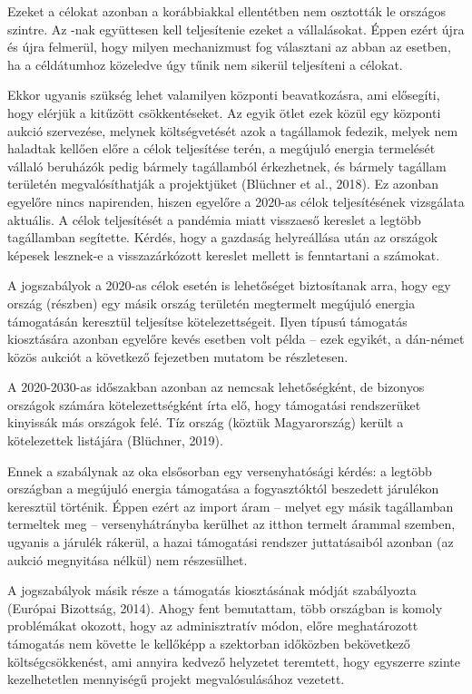 \documentclass[twoside, magyar, showtrims]{corvinusphd}
\theoremstyle{plain}
\theoremstyle{remark}
\theoremstyle{definition}
\begin{document}
Ezeket a célokat azonban a korábbiakkal
ellentétben nem osztották le országos szintre.
Az -nak együttesen kell teljesítenie ezeket a vállalásokat.
Éppen ezért újra és újra felmerül,
hogy milyen mechanizmust fog választani
az  abban az esetben, ha a céldátumhoz közeledve
úgy tűnik nem sikerül teljesíteni a célokat.

Ekkor ugyanis szükség lehet valamilyen
központi beavatkozásra, ami elősegíti, hogy
elérjük a kitűzött csökkentéseket. Az egyik
ötlet ezek közül egy központi aukció szervezése,
melynek költségvetését azok a tagállamok fedezik,
melyek nem haladtak  kellően előre a célok teljesítése terén,
a megújuló energia termelését vállaló
beruházók pedig bármely tagállamból érkezhetnek,
és bármely tagállam területén megvalósíthatják
a projektjüket (Blüchner et al., 2018).
Ez azonban egyelőre nincs napirenden, hiszen egyelőre
a 2020-as célok teljesítésének vizsgálata aktuális.
A célok teljesítését a pandémia miatt visszaeső
kereslet a legtöbb tagállamban segítette.
Kérdés, hogy a gazdaság helyreállása után
az országok képesek lesznek-e a visszazárkózott
kereslet mellett is fenntartani a számokat.

A jogszabályok a 2020-as célok esetén
is lehetőséget biztosítanak arra, hogy egy ország
(részben) egy másik ország területén megtermelt
megújuló energia támogatásán keresztül
teljesítse kötelezettségeit. Ilyen típusú támogatás
kiosztására azonban egyelőre kevés esetben
volt példa -- ezek egyikét, a dán-német közös aukciót
a következő fejezetben mutatom be részletesen.

A 2020-2030-as időszakban azonban
az  nemcsak lehetőségként, de bizonyos
országok számára kötelezettségként írta elő,
hogy támogatási rendszerüket kinyissák más országok felé.
Tíz ország (köztük Magyarország) került
a kötelezettek listájára (Blüchner, 2019).

Ennek a szabálynak az oka elsősorban egy versenyhatósági kérdés:
a legtöbb országban a megújuló energia támogatása
a fogyasztóktól beszedett járulékon keresztül történik.
Éppen ezért az import áram -- melyet egy másik
tagállamban termeltek meg -- versenyhátrányba kerülhet az itthon
termelt árammal szemben, ugyanis a járulék rákerül,
a hazai támogatási rendszer juttatásaiból azonban
(az aukció megnyitása nélkül) nem részesülhet.

A jogszabályok másik része a támogatás
kiosztásának módját szabályozta
(Európai Bizottság, 2014). Ahogy fent bemutattam,
több országban is komoly problémákat okozott,
hogy az adminisztratív módon, előre meghatározott támogatás
nem követte le kellőképp a szektorban
időközben bekövetkező költségcsökkenést,
ami annyira kedvező helyzetet teremtett,
hogy egyszerre szinte kezelhetetlen
mennyiségű projekt megvalósulásához vezetett. 
\end{document}
